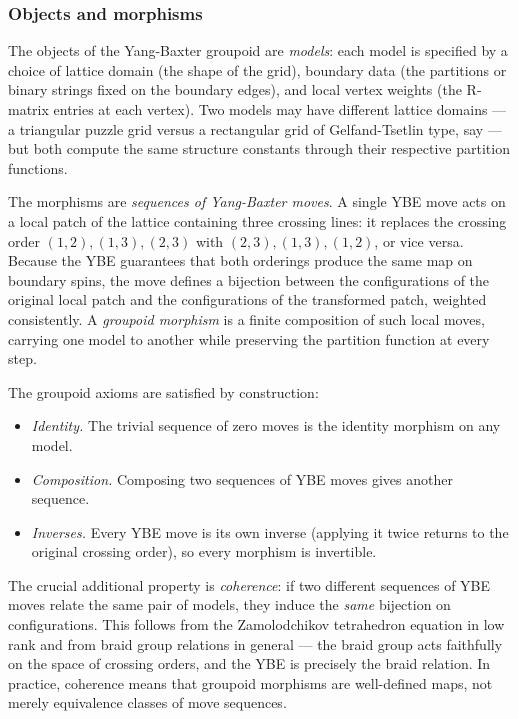 \subsubsection*{Objects and morphisms}

The objects of the Yang-Baxter groupoid are \emph{models}: each model
is specified by a choice of lattice domain (the shape of the grid),
boundary data (the partitions or binary strings fixed on the boundary
edges), and local vertex weights (the R-matrix entries at each
vertex).  Two models may have different lattice domains --- a
triangular puzzle grid versus a rectangular grid of Gelfand-Tsetlin
type, say --- but both compute the same structure constants through
their respective partition functions.

The morphisms are \emph{sequences of Yang-Baxter moves}.  A single YBE
move acts on a local patch of the lattice containing three crossing
lines: it replaces the crossing order $(1,2), (1,3), (2,3)$ with
$(2,3), (1,3), (1,2)$, or vice versa.  Because the YBE guarantees
that both orderings produce the same map on boundary spins, the move
defines a bijection between the configurations of the original local
patch and the configurations of the transformed patch, weighted
consistently.  A \emph{groupoid morphism} is a finite composition of
such local moves, carrying one model to another while preserving the
partition function at every step.

The groupoid axioms are satisfied by construction:
\begin{itemize}
\item \emph{Identity.}  The trivial sequence of zero moves is the
  identity morphism on any model.
\item \emph{Composition.}  Composing two sequences of YBE moves
  gives another sequence.
\item \emph{Inverses.}  Every YBE move is its own inverse (applying
  it twice returns to the original crossing order), so every morphism
  is invertible.
\end{itemize}

\noindent
The crucial additional property is \emph{coherence}: if two different
sequences of YBE moves relate the same pair of models, they induce the
\emph{same} bijection on configurations.  This follows from the
Zamolodchikov tetrahedron equation in low rank and from braid group
relations in general --- the braid group acts faithfully on the space
of crossing orders, and the YBE is precisely the braid relation.  In
practice, coherence means that groupoid morphisms are well-defined
maps, not merely equivalence classes of move sequences.

